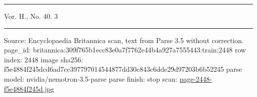 \documentclass[10pt]{article}
\begin{document}
\par\vspace{4pt}\noindent\rule{0.3\linewidth}{0.4pt}\par
{\footnotesize
Vor. H., No. 40. 3\par}
\vfill\par\noindent\rule{\linewidth}{0.4pt}\par
{\scriptsize\color{gray}\noindent Source: Encyclopaedia Britannica scan, text from Parse 3.5 without correction. page\_id: britannica:309f765b1ecc83e0a7f7762e44b4a927a7555443:train:2448 \quad row index: 2448 \quad image sha256: f5e4884f245dcd6ad7cc397797014544877dd30c843c6dde29d97203b6b52245 \quad parse model: nvidia/nemotron-3.5-parse \quad parse finish: stop \quad scan: \href{../scans/page-2448-f5e4884f245d.jpg}{page-2448-f5e4884f245d.jpg}\par}
\end{document}
